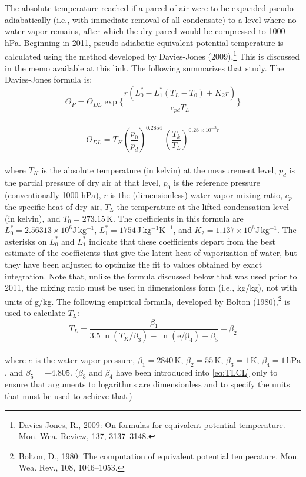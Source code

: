 \documentclass[
  english,
]{book}
\begin{document}
The absolute temperature reached if a parcel of air were to be expanded pseudo-adiabatically (i.e., with immediate removal of all condensate) to a level where no water vapor remains, after which the dry parcel would be compressed to 1000 hPa. Beginning in 2011, pseudo-adiabatic equivalent potential temperature is calculated using the method developed by Davies-Jones (2009).\footnote{Davies-Jones, R., 2009: On formulas for equivalent potential temperature. Mon. Wea. Review, 137, 3137--3148.}
This is discussed in the memo available at this link. The following summarizes that study. The Davies-Jones formula is:\\
\begin{equation}
\Theta_{P}=\Theta_{DL}\exp\{\frac{r(L_{0}^{*}-L_{1}^{*}(T_{L}-T_{0})+K_{2}r)}{c_{pd}T_{L}}\}
\label{eq:THETAP}
\end{equation}\\
\begin{equation}
\Theta_{DL}=T_{K}(\frac{p_{0}}{p_{d}})^{0.2854}\,(\frac{T_{k}}{T_{L}})^{0.28\times10^{-3}r}
\label{eq:THETADL}
\end{equation}\\
where \(T_K\) is the absolute temperature (in kelvin) at the measurement level, \(p_d\) is the partial pressure of dry air at that level, \(p_0\) is the reference pressure (conventionally 1000 hPa), \(r\) is the (dimensionless) water vapor mixing ratio, \(c_p\) the specific heat of dry air, \(T_L\) the temperature at the lifted condensation level (in kelvin), and \(T_0=273.15\,\mathrm{K}\). The coefficients in this formula are \(L_0^* = 2.56313\times 10^6\mathrm{J\,kg^{-1}}\),
\(L_1^* = 1754\,\mathrm{J\,kg^{-1}K^{-1}}\), and \(K_2 = 1.137\times 10^6\mathrm{J\,kg^{-1}}\). The asterisks on \(L_0^*\) and \(L_1^*\) indicate that these coefficients depart from the best estimate of the coefficients that give the latent heat of vaporization of water, but they have been adjusted to optimize the fit to values obtained by exact integration. Note that, unlike the formula discussed below that was used prior to 2011, the mixing ratio must be used in dimensionless form (i.e., kg/kg), not with units of g/kg. The following empirical formula, developed by Bolton (1980),\footnote{Bolton, D., 1980: The computation of equivalent potential temperature. Mon. Wea. Rev., 108, 1046--1053.}
is used to calculate \(T_L\):\\
\begin{equation}
T_{L}=\frac{\beta_{1}}{3.5\ln(T_{K}/\beta_{3})-\ln(\mathrm{e/\beta_{4}})+\beta_{5}}+\beta_{2}
\label{eq:TLCL}
\end{equation}\\
where \(e\) is the water vapor pressure, \(\beta_1 = 2840\,\mathrm{K}\), \(\beta_2 = 55\,\mathrm{K}\), \(\beta_3 = 1\,\mathrm{K}\), \(\beta_4 = 1\,\mathrm{hPa}\), and \(\beta_5 = -4.805\). (\(\beta_3\) and \(\beta_4\) have been introduced into \eqref{eq:TLCL} only to ensure that arguments to logarithms are dimensionless and to specify the units that must be used to achieve that.)
\end{document}
